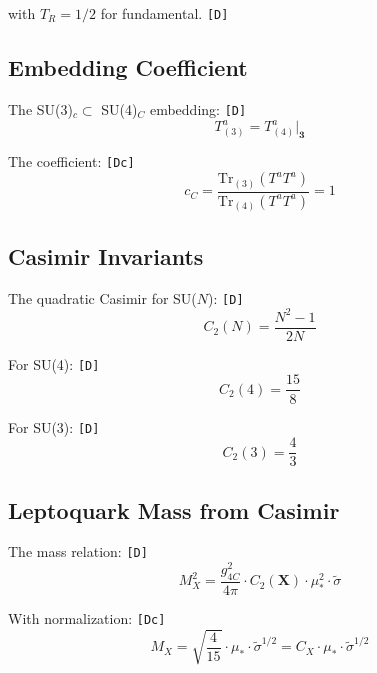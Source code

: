 \documentclass[11pt,a4paper]{article}
\newcommand{\tagD}{\textcolor{green!50!black}{\texttt{[D]}}}
\newcommand{\tagDc}{\textcolor{blue!70!black}{\texttt{[Dc]}}}
\theoremstyle{definition}
\begin{document}
with $T_R = 1/2$ for fundamental. \tagD{}

\subsection{Embedding Coefficient}
\label{app:embed-coef}

The SU(3)$_c \subset$ SU(4)$_C$ embedding: \tagD{}
\begin{equation}
\label{eq:embed-1}
T^a_{(3)} = T^a_{(4)}|_{\mathbf{3}}
\end{equation}

The coefficient: \tagDc{}
\begin{equation}
\label{eq:embed-2}
c_C = \frac{\text{Tr}_{(3)}(T^a T^a)}{\text{Tr}_{(4)}(T^a T^a)} = 1
\end{equation}

\subsection{Casimir Invariants}
\label{app:casimir}

The quadratic Casimir for SU($N$): \tagD{}
\begin{equation}
\label{eq:casimir-1}
C_2(N) = \frac{N^2-1}{2N}
\end{equation}

For SU(4): \tagD{}
\begin{equation}
\label{eq:casimir-2}
C_2(4) = \frac{15}{8}
\end{equation}

For SU(3): \tagD{}
\begin{equation}
\label{eq:casimir-3}
C_2(3) = \frac{4}{3}
\end{equation}

\subsection{Leptoquark Mass from Casimir}
\label{app:lq-casimir}

The mass relation: \tagD{}
\begin{equation}
\label{eq:lq-mass-casimir}
M_X^2 = \frac{g_{4C}^2}{4\pi}\cdot C_2(\mathbf{X}) \cdot \mu_*^2 \cdot \tilde{\sigma}
\end{equation}

With normalization: \tagDc{}
\begin{equation}
\label{eq:lq-mass-norm}
M_X = \sqrt{\frac{4}{15}}\cdot\mu_*\cdot\tilde{\sigma}^{1/2} = C_X\cdot\mu_*\cdot\tilde{\sigma}^{1/2}
\end{equation}
\end{document}
